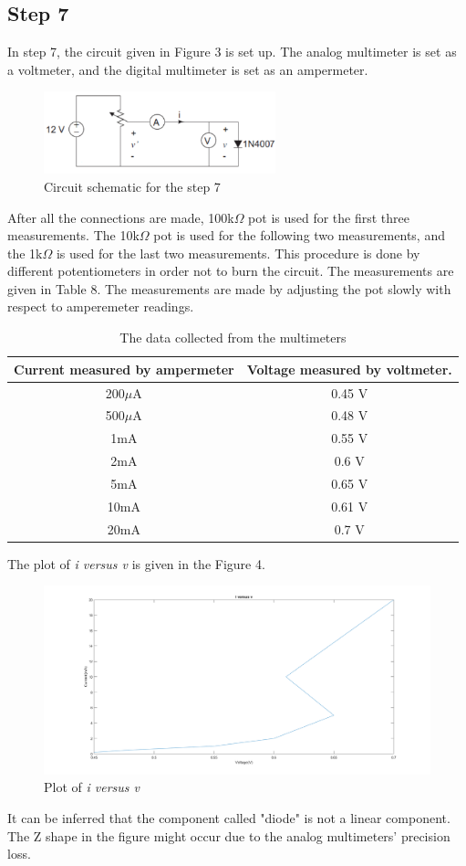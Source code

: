 \documentclass[letterpaper,12pt]{article}
\begin{document}
\subsection{Step 7}
In step 7, the circuit given in Figure 3 is set up. The analog multimeter is set as a voltmeter, and the digital multimeter is set as an ampermeter.  
\begin{figure}[H]
	\centering
	\includegraphics[width=0.6\textwidth]{7.png}
	\caption{Circuit schematic for the step 7}
\end{figure} 
After all the connections are made, 100k\(\Omega\) pot is used for the first three measurements. The 10k\(\Omega\) pot is used for the following two measurements, and the 1k\(\Omega\) is used for the last two measurements. This procedure is done by different potentiometers in order not to burn the circuit. The measurements are given in Table 8. The measurements are made by adjusting the pot slowly with respect to amperemeter readings.
\begin{table}[H]
	\centering
	\caption{The data  collected from the  multimeters}
	\vspace{2mm}
	\begin{tabular}{|| c | c ||}
		\hline
	Current measured by ampermeter & Voltage measured by voltmeter. \\\hline
	\hline
	200\( \mu \)A & 0.45 V \\\hline
	500\( \mu \)A & 0.48 V \\\hline
	1mA & 0.55 V \\\hline
	2mA & 0.6 V \\\hline
	5mA & 0.65 V \\\hline
	10mA & 0.61 V\\\hline
	20mA & 0.7 V \\\hline
	\end{tabular}
\end{table}
The plot of \emph{i versus v} is given in the Figure 4.
\begin{figure}[H]
	\centering
	\includegraphics[width=1\textwidth]{7fig.png}
	\caption{Plot of \emph{i versus v}}
\end{figure} 
It can be inferred that the component called "diode" is not a linear component. The Z shape in the figure might occur due to the analog multimeters' precision loss. 
\end{document}
